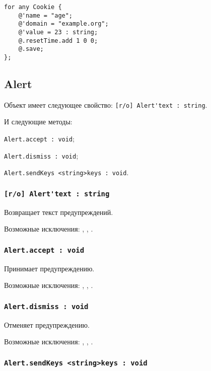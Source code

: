 \begin{lstlisting}[caption=Создания новых cookie, label=newcookies]
for any Cookie {
	@'name = "age";
	@'domain = "example.org";
	@'value = 23 : string;
	@.resetTime.add 1 0 0;
	@.save;
};
\end{lstlisting}


\subsection{{\color{orange} Alert}}

Объект \alert{} имеет следующее свойство: \lstinline|[r/o] Alert'text : string|.

И следующие методы:
\begin{icItems}
	\item \lstinline|Alert.accept : void|;
	\item \lstinline|Alert.dismiss : void|;
	\item \lstinline|Alert.sendKeys <string>keys : void|.
\end{icItems}

\subsubsection{\lstinline|[r/o] Alert'text : string|}

Возвращает текст предупреждений.

Возможные исключения: , , .

\subsubsection{\lstinline|Alert.accept : void|}

Принимает предупреждению.

Возможные исключения: , , .

\subsubsection{\lstinline|Alert.dismiss : void|}

Отменяет предупреждению.

Возможные исключения: , , .

\subsubsection{\lstinline|Alert.sendKeys <string>keys : void|}


